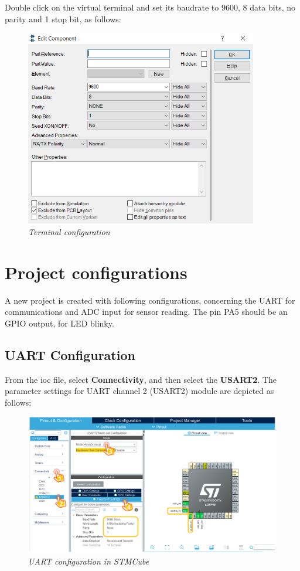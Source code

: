 Double click on the virtual terminal and set its baudrate to 9600, 8 data bits, no parity and 1 stop bit, as follows:
\newpage
\begin{figure}[!htp]
    \centering
    \includegraphics[width=4in]{source/picture/bai_6/Proteus_Simulation2.PNG}
    \caption{\textit{Terminal configuration}}
    \label{bai4_pic_button_schematic_0}
\end{figure}

\section{Project configurations}
A new project is created with following configurations, concerning the UART for communications and ADC input for sensor reading. The pin PA5 should be an GPIO output, for LED blinky.
\subsection{UART Configuration}
From the ioc file, select \textbf{Connectivity}, and then select the \textbf{USART2}. The parameter settings for UART channel 2 (USART2) module are depicted as follows:

\begin{figure}[!htp]
    \centering
    \includegraphics[width=4.5in]{source/picture/bai_6/stm32_uart_1.PNG}
    \caption{\textit{UART configuration in STMCube}}
    \label{1}
\end{figure}

